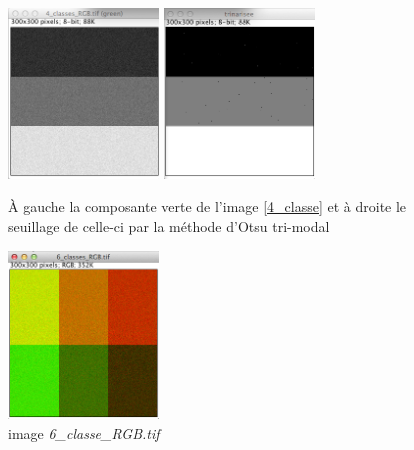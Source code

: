 \documentclass[a4paper,10pt]{article}
\begin{document}
\begin{figure}
\begin{center}
	\includegraphics[width=4cm]{images/4_classe_vert}
	\includegraphics[width=4cm]{images/4_classe_trinaire}
\end{center}
	\caption{\`A gauche la composante verte de l'image \ref{4_classe} et \`a droite le seuillage de celle-ci par la m\'ethode d'Otsu tri-modal}
	\label{4_classe_gris_vert}
\end{figure}

\begin{figure}
\begin{center}
	\includegraphics[width=4cm]{images/6_classe}
\end{center}
	\caption{image \emph{6\_classe\_RGB.tif}}
	\label{6_classe}
\end{figure}
\end{document}
